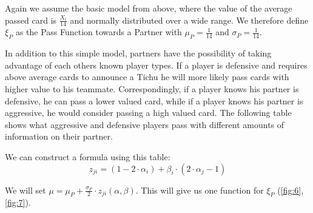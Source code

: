 Again we assume the basic model from above, where the value of the average passed card is $\frac{X_i}{14}$ and normally distributed over a wide range. We therefore define $\xi_P$ as the Pass Function towards a Partner with $\mu_P =\frac{1}{14}$ and $\sigma_P = \frac{1}{14}$.


In addition to this simple model, partners have the possibility of taking advantage of each others known player types. If a player is defensive and requires above average cards to announce a Tichu he will more likely pass cards with higher value to his teammate. Correspondingly, if a player knows his partner is defensive, he can pass a lower valued card, while if a player knows his partner is aggressive, he would consider passing a high valued card. The following table shows what aggressive and defensive players pass with different amounts of information on their partner. \\
\begin{table}[h]
\centering
\caption*{$P_R$ - Player receiving, $P_P$ - Player passing} 
\label{tab:my-table}
\end{table}
We can construct a formula using this table: 
\begin{equation*}
z_{ji} = (1 - 2\cdot\alpha_i) + \beta_i \cdot (2\cdot\alpha_j - 1)
\end{equation*}

We will set $\mu = \mu_P + \frac{\sigma_P}{2} \cdot z_{ji}(\alpha, \beta)$. This will give us one function for $\xi_P$ (\ref{fig:6},\ref{fig:7}).

